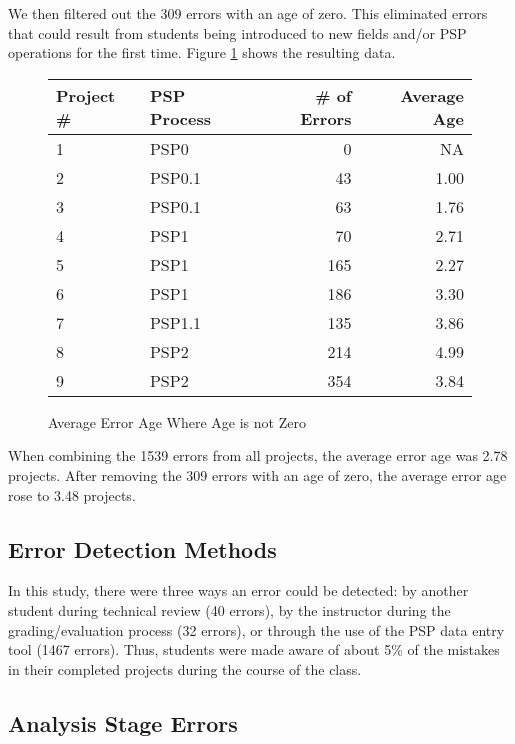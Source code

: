   We then filtered out the 309 errors with an age of zero.  This
  eliminated errors that could result from students being
  introduced to new fields and/or PSP operations for the first time.  
  Figure  \ref{errorAgeSome} shows the resulting data.

  \begin{figure} [htpb]
  \begin{center} 
  \begin{tabular}{|l|l|r|r|}\hline 
  Project \# & PSP Process & \# of Errors & Average Age \\ \hline\hline 
  1 & PSP0    &   0  &    NA \\ \hline 
  2 & PSP0.1  &  43  &  1.00 \\ \hline 
  3 & PSP0.1  &  63  &  1.76 \\ \hline
  4 & PSP1    &  70  &  2.71 \\ \hline
  5 & PSP1    & 165  &  2.27 \\ \hline
  6 & PSP1    & 186  &  3.30 \\ \hline
  7 & PSP1.1  & 135  &  3.86 \\ \hline
  8 & PSP2    & 214  &  4.99 \\ \hline
  9 & PSP2    & 354  &  3.84 \\ \hline
  \end{tabular}
  \end{center} 
  \caption{\label{errorAgeSome}Average Error Age Where Age is not Zero}
  \end{figure}
      
When combining the 1539 errors from all projects, the average error age
was 2.78 projects.  After removing the 309 errors with an age of zero,
the average error age rose to 3.48 projects.


\subsection{Error Detection Methods}

In this study, there were three ways an error could be detected: by another
student during technical review (40 errors), by the instructor during the
grading/evaluation process (32 errors), or through the use of the PSP data
entry tool (1467 errors).  Thus, students were made aware of about 5\% of
the mistakes in their completed projects during the course of the class.

\subsection{Analysis Stage Errors}

